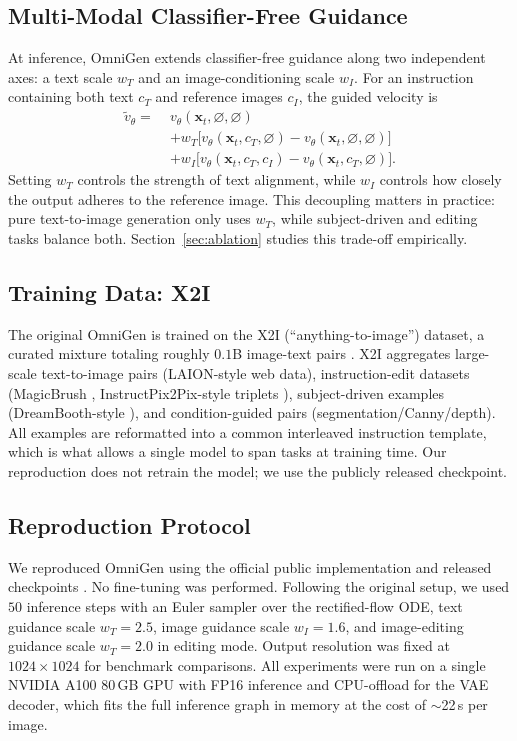 \documentclass[conference]{IEEEtran}
\begin{document}
\subsection{Multi-Modal Classifier-Free Guidance}
At inference, OmniGen extends classifier-free guidance \cite{ho2021classifier} along two independent axes: a text scale $w_T$ and an image-conditioning scale $w_I$. For an instruction containing both text $c_T$ and reference images $c_I$, the guided velocity is
\begin{align}
\tilde v_\theta=\;& v_\theta(\mathbf{x}_t,\varnothing,\varnothing) \nonumber \\
&+w_T\bigl[v_\theta(\mathbf{x}_t,c_T,\varnothing)-v_\theta(\mathbf{x}_t,\varnothing,\varnothing)\bigr]\nonumber \\
&+w_I\bigl[v_\theta(\mathbf{x}_t,c_T,c_I)-v_\theta(\mathbf{x}_t,c_T,\varnothing)\bigr].
\label{eq:dualcfg}
\end{align}
Setting $w_T$ controls the strength of text alignment, while $w_I$ controls how closely the output adheres to the reference image. This decoupling matters in practice: pure text-to-image generation only uses $w_T$, while subject-driven and editing tasks balance both. Section~\ref{sec:ablation} studies this trade-off empirically.

\subsection{Training Data: X2I}
The original OmniGen is trained on the X2I (``anything-to-image'') dataset, a curated mixture totaling roughly $0.1$B image-text pairs \cite{omnigen2024}. X2I aggregates large-scale text-to-image pairs (LAION-style web data), instruction-edit datasets (MagicBrush \cite{magicbrush}, InstructPix2Pix-style triplets \cite{brooks2023instructpix2pix}), subject-driven examples (DreamBooth-style \cite{dreambench}), and condition-guided pairs (segmentation/Canny/depth). All examples are reformatted into a common interleaved instruction template, which is what allows a single model to span tasks at training time. Our reproduction does not retrain the model; we use the publicly released checkpoint.

\subsection{Reproduction Protocol}
We reproduced OmniGen using the official public implementation and released checkpoints \cite{omnigen2024}. No fine-tuning was performed. Following the original setup, we used $50$ inference steps with an Euler sampler over the rectified-flow ODE, text guidance scale $w_T=2.5$, image guidance scale $w_I=1.6$, and image-editing guidance scale $w_T=2.0$ in editing mode. Output resolution was fixed at $1024\times 1024$ for benchmark comparisons. All experiments were run on a single NVIDIA A100 80\,GB GPU with FP16 inference and CPU-offload for the VAE decoder, which fits the full inference graph in memory at the cost of $\sim$22\,s per image.
\end{document}
